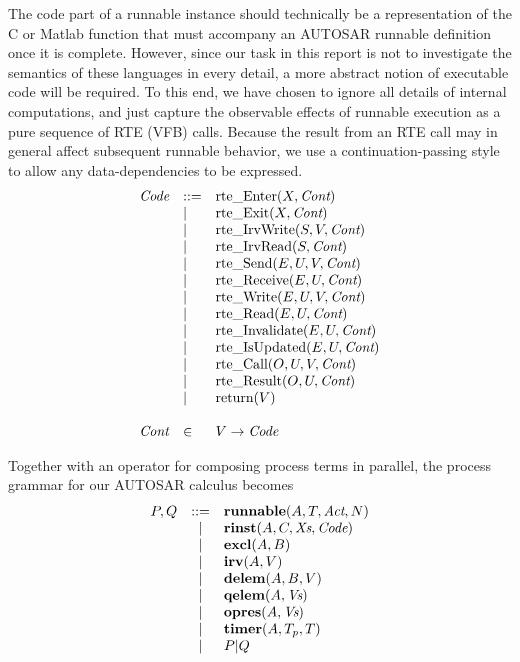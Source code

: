\documentclass[twocolumn]{article}
\newcommand{\V}[1]{\mbox{\it #1}}
\newcommand{\Code}{\V{Code}}
\newcommand{\Cont}{\V{Cont}}
\newcommand{\Act}{\V{Act}}
\newcommand{\Xs}{\V{Xs}}
\newcommand{\Vs}{\V{Vs}}
\newcommand{\runnable}[4]{\mbox{\bf runnable}(#1,#2,#3,#4)}
\newcommand{\rinst}[4]{\mbox{\bf rinst}(#1,#2,#3,#4)}
\newcommand{\excl}[2]{\mbox{\bf excl}(#1,#2)}
\newcommand{\irv}[2]{\mbox{\bf irv}(#1,#2)}
\newcommand{\qelem}[2]{\mbox{\bf qelem}(#1,#2)}
\newcommand{\delem}[3]{\mbox{\bf delem}(#1,#2,#3)}
\newcommand{\opres}[2]{\mbox{\bf opres}(#1,#2)}
\newcommand{\timer}[3]{\mbox{\bf timer}(#1,#2, #3)}
\newcommand{\Enter}[2]{\mbox{rte\_Enter}(#1,#2)}
\newcommand{\Exit}[2]{\mbox{rte\_Exit}(#1,#2)}
\newcommand{\IrvWrite}[3]{\mbox{rte\_IrvWrite}(#1,#2,#3)}
\newcommand{\IrvRead}[2]{\mbox{rte\_IrvRead}(#1,#2)}
\newcommand{\Send}[4]{\mbox{rte\_Send}(#1,#2,#3,#4)}
\newcommand{\Receive}[3]{\mbox{rte\_Receive}(#1,#2,#3)}
\newcommand{\Write}[4]{\mbox{rte\_Write}(#1,#2,#3,#4)}
\newcommand{\Read}[3]{\mbox{rte\_Read}(#1,#2,#3)}
\newcommand{\Invalidate}[3]{\mbox{rte\_Invalidate}(#1,#2,#3)}
\newcommand{\IsUpdated}[3]{\mbox{rte\_IsUpdated}(#1,#2,#3)}
\newcommand{\Call}[4]{\mbox{rte\_Call}(#1,#2,#3,#4)}
\newcommand{\Result}[3]{\mbox{rte\_Result}(#1,#2,#3)}
\newcommand{\Return}[1]{\mbox{return}(#1)}
\begin{document}
The code part of a runnable instance should technically be a representation of the C or Matlab function that must accompany an AUTOSAR runnable definition once it is complete. However, since our task in this report is not to investigate the semantics of these languages in every detail, a more abstract notion of executable code will be required. To this end, we have chosen to ignore all details of internal computations, and just capture the observable effects of runnable execution as a pure sequence of RTE (VFB) calls. Because the result from an RTE call may in general affect subsequent runnable behavior, we use a continuation-passing style to allow any data-dependencies to be expressed.
$$
\begin{array}{lll}
	\Code	& ::=	& \Enter{X}{\Cont}			\\
			& |	& \Exit{X}{\Cont}			\\
			& |	& \IrvWrite{S}{V}{\Cont}		\\
			& |	& \IrvRead{S}{\Cont}			\\
			& |	& \Send{E}{U}{V}{\Cont}		\\
			& |	& \Receive{E}{U}{\Cont}		\\
			& |	& \Write{E}{U}{V}{\Cont}		\\
			& |	& \Read{E}{U}{\Cont}		\\
			& |	& \Invalidate{E}{U}{\Cont}		\\
			& |	& \IsUpdated{E}{U}{\Cont}		\\
			& |	& \Call{O}{U}{V}{\Cont}		\\
			& |	& \Result{O}{U}{\Cont}		\\
			& |	& \Return{V}				\\
	\\
	\Cont	& \in	& V \rightarrow \Code		\\
\end{array}
$$

Together with an operator for composing process terms in parallel, the process grammar for our AUTOSAR calculus becomes
$$
\begin{array}{rcll}
	P,Q 	& ::= &
		\runnable{A}{T}{\Act}{N}	\\
		& | &
		\rinst{A}{C}{\Xs}{\Code}	\\
		& | &
		\excl{A}{B}			\\
		& | &
		\irv{A}{V}				\\
		& | &
		\delem{A}{B}{V}			\\
		& | &
		\qelem{A}{\Vs}			\\
		& | &
		\opres{A}{\Vs}			\\
		& | &
		\timer{A}{T_p}{T}		\\
		& | &
		P|Q					\\
\end{array}
$$
\end{document}
